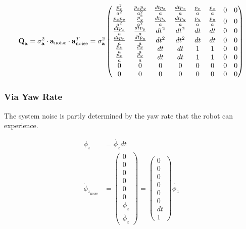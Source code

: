 \documentclass{article}
\begin{document}
\begin{equation}
  \textbf{Q}_{\textbf{a}} = \sigma^2_{\textbf{a}} \cdot \textbf{a}_{\textrm{noise}} \cdot \textbf{a}_{\textrm{noise}}^T \\
  = \sigma^2_{\textbf{a}} \left(\begin{matrix}\frac{p_{x}^{2}}{a^{2}} & \frac{p_{x} p_{y}}{a^{2}} & \frac{dt p_{x}}{a} & \frac{dt p_{x}}{a} & \frac{p_{x}}{a} & \frac{p_{x}}{a} & 0 & 0\\\frac{p_{x} p_{y}}{a^{2}} & \frac{p_{y}^{2}}{a^{2}} & \frac{dt p_{y}}{a} & \frac{dt p_{y}}{a} & \frac{p_{y}}{a} & \frac{p_{y}}{a} & 0 & 0\\\frac{dt p_{x}}{a} & \frac{dt p_{y}}{a} & dt^{2} & dt^{2} & dt & dt & 0 & 0\\\frac{dt p_{x}}{a} & \frac{dt p_{y}}{a} & dt^{2} & dt^{2} & dt & dt & 0 & 0\\\frac{p_{x}}{a} & \frac{p_{y}}{a} & dt & dt & 1 & 1 & 0 & 0\\\frac{p_{x}}{a} & \frac{p_{y}}{a} & dt & dt & 1 & 1 & 0 & 0\\0 & 0 & 0 & 0 & 0 & 0 & 0 & 0\\0 & 0 & 0 & 0 & 0 & 0 & 0 & 0\end{matrix}\right)
\end{equation}


\subsubsection{Via Yaw Rate}

The system noise is partly determined by the yaw rate that the robot can experience.

\begin{align}
  \phi_z &= \dot{\phi_{z}} dt \\
  \dot{\phi}_{z_\textrm{noise}} &= \left(\begin{matrix}0\\0\\0\\0\\0\\0\\\phi_z\\\dot{\phi_z}\end{matrix}\right) =
  \left(\begin{matrix}0\\0\\0\\0\\0\\0\\dt\\1\end{matrix}\right) \dot{\phi_z}
\end{align}
\end{document}
